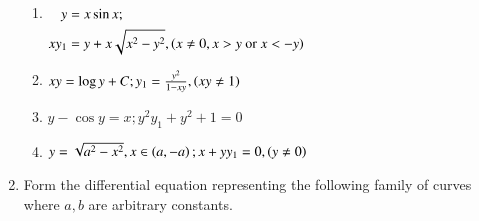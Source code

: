 \begin{enumerate}[label=\arabic*.,ref=\thesubsection.\theenumi]
\begin{enumerate}[label=(\roman*)]
\item  
$
\begin{alignedat}[t]{2}
y &= x\sin x;
\\
xy_1 &= y + x \sqrt{x^2-y^2}, \left(x \ne 0, x > y \text{ or } x < -y\right)
\end{alignedat}
$
\item  $xy = \log y + C; y_1 = \frac{y^2}{1-xy}, \left(xy \ne 1\right)$
\item  $y -\cos y= x; y^2y_1 + y^2 + 1 = 0$
\item  $y = \sqrt{a^2-x^2}, x \in \left(a,-a\right);  x+yy_1 = 0, \left(y \ne 0\right)$
%
\end{enumerate}
%
\item Form the differential equation representing the following family of curves  where $a, b$ are arbitrary constants.


\end{enumerate}

